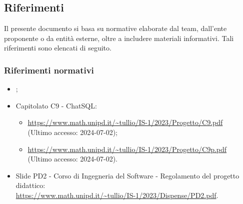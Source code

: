\subsection{Riferimenti}
Il presente documento si basa su normative elaborate dal team, dall'ente proponente o da entità esterne, oltre a includere materiali informativi. Tali riferimenti sono elencati di seguito.
\subsubsection{Riferimenti normativi}
\begin{itemize}
  \item \NormeDiProgetto;
  \item Capitolato C9 - ChatSQL:
  \begin{itemize}
    \item \href{https://www.math.unipd.it/~tullio/IS-1/2023/Progetto/C9.pdf}{https://www.math.unipd.it/\textasciitilde tullio/IS-1/2023/Progetto/C9.pdf} \\ (Ultimo accesso: 2024-07-02);
    \item \href{https://www.math.unipd.it/~tullio/IS-1/2023/Progetto/C9.pdf}{https://www.math.unipd.it/\textasciitilde tullio/IS-1/2023/Progetto/C9p.pdf} \\ (Ultimo accesso: 2024-07-02).
  \end{itemize}
  \item Slide PD2 - Corso di Ingegneria del Software - Regolamento del progetto didattico:\\ \href{https://www.math.unipd.it/~tullio/IS-1/2023/Dispense/PD2.pdf}{https://www.math.unipd.it/\textasciitilde tullio/IS-1/2023/Dispense/PD2.pdf}.
\end{itemize}

